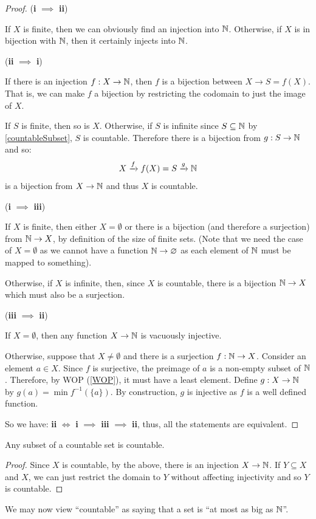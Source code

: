 \documentclass[../main.tex]{subfiles}
\begin{document}
\begin{proof}\par
  (\textbf{i} $\implies$ \textbf{ii})
  \begin{indentenvironment}
    If $X$ is finite, then we can obviously find an injection into $\mathbb{N}$.
    Otherwise, if $X$ is in bijection with $\mathbb{N}$, then it certainly injects into $\mathbb{N}$.
  \end{indentenvironment}
  (\textbf{ii} $\implies$ \textbf{i})
  \begin{indentenvironment}
    If there is an injection $f: X \to \mathbb{N}$, then $f$ is a bijection between $X \to S = f(X)$.
    That is, we can make $f$ a bijection by restricting the codomain to just the image of $X$.

    If $S$ is finite, then so is $X$.
    Otherwise, if $S$ is infinite since $S \subseteq \mathbb{N}$ by \cref{countableSubset}, $S$ is countable.
    Therefore there is a bijection from $g: S \to \mathbb{N}$ and so:
    \[
      X \xrightarrow{f} f(X) = S \xrightarrow{g} \mathbb{N}
    \]
    is a bijection from $X \to \mathbb{N}$ and thus $X$ is countable.
  \end{indentenvironment}
  (\textbf{i} $\implies$ \textbf{iii})
  \begin{indentenvironment}
    If $X$ is finite, then either $X = \emptyset$ or there is a bijection (and therefore a surjection) from $\mathbb{N} \to X$, by definition of the size of finite sets.
    (Note that we need the case of $X = \emptyset$ as we cannot have a function $\mathbb{N} \to \varnothing$ as each element of $\mathbb{N}$ must be mapped to something).

    Otherwise, if $X$ is infinite, then, since $X$ is countable, there is a bijection $\mathbb{N} \to X$ which must also be a surjection.
  \end{indentenvironment}
  (\textbf{iii} $\implies$ \textbf{ii})
  \begin{indentenvironment}
    If $X = \emptyset$, then any function $X \to \mathbb{N}$ is vacuously injective.

    Otherwise, suppose that $X \neq \emptyset$ and there is a surjection $f: \mathbb{N} \to X$.
    Consider an element $a \in X$.
    Since $f$ is surjective, the preimage of $a$ is a non-empty subset of $\mathbb{N}$.
    Therefore, by WOP (\cref{WOP}), it must have a least element.
    Define $g: X \to \mathbb{N}$ by $g(a) = \min f^{-1}(\{a\})$.
    By construction, $g$ is injective as $f$ is a well defined function.
  \end{indentenvironment}
  So we have: \textbf{ii} $\iff$ \textbf{i} $\implies$ \textbf{iii} $\implies$ \textbf{ii}, thus, all the statements are equivalent.
\end{proof}
\begin{corollary}
  Any subset of a countable set is countable. \label{subsetOfCountableSet}
\end{corollary}
\begin{proof}
  Since $X$ is countable, by the above, there is an injection $X \to \mathbb{N}$.
  If $Y \subseteq X$ and $X$, we can just restrict the domain to $Y$ without affecting injectivity and so $Y$ is countable.
\end{proof}
We may now view ``countable'' as saying that a set is ``at most as big as $\mathbb{N}$''.
\end{document}
